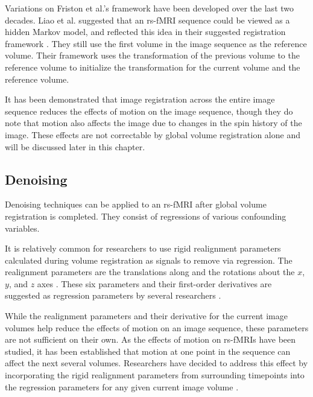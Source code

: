 Variations on Friston et al.'s framework have been developed over the last two decades. Liao et al. suggested that an rs-fMRI sequence could be viewed as a hidden Markov model, and reflected this idea in their suggested registration framework \cite{Liao2016}. They still use the first volume in the image sequence as the reference volume. Their framework uses the transformation of the previous volume to the reference volume to initialize the transformation for the current volume and the reference volume. 

It has been demonstrated that image registration across the entire image sequence reduces the effects of motion on the image sequence, though they do note that motion also affects the image due to changes in the spin history of the image. These effects are not correctable by global volume registration alone and will be discussed later in this chapter.

\subsection{Denoising}

Denoising techniques can be applied to an rs-fMRI after global volume registration is completed. They consist of regressions of various confounding variables. 

It is relatively common for researchers to use rigid realignment parameters calculated during volume registration as signals to remove via regression. The realignment parameters are the translations along and the rotations about the $x$, $y$, and $z$ axes \cite{Power2012}. These six parameters and their first-order derivatives are suggested as regression parameters by several researchers \cite{Power2012} \cite{Satterthwaite2012} \cite{VanDijk2012}. 

While the realignment parameters and their derivative for the current image volumes help reduce the effects of motion on an image sequence, these parameters are not sufficient on their own. As the effects of motion on rs-fMRIs have been studied, it has been established that motion at one point in the sequence can affect the next several volumes. Researchers have decided to address this effect by incorporating the rigid realignment parameters from surrounding timepoints into the regression parameters for any given current image volume \cite{Power2014} \cite{Satterthwaite2013} \cite{Yan2013a}.

